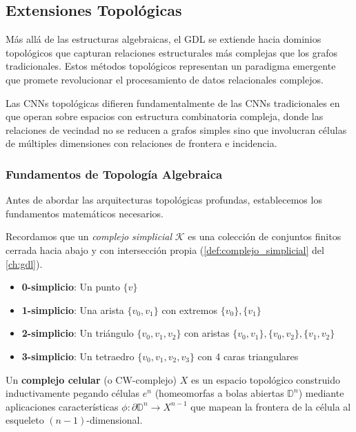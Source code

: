 \subsection{Extensiones Topológicas}

Más allá de las estructuras algebraicas, el \gls{GDL} se extiende hacia dominios topológicos que capturan relaciones estructurales más complejas que los grafos tradicionales. Estos métodos topológicos representan un paradigma emergente que promete revolucionar el procesamiento de datos relacionales complejos.

Las CNNs topológicas difieren fundamentalmente de las CNNs tradicionales en que operan sobre espacios con estructura combinatoria compleja, donde las relaciones de vecindad no se reducen a grafos simples sino que involucran células de múltiples dimensiones con relaciones de frontera e incidencia.

\subsubsection{Fundamentos de Topología Algebraica}

Antes de abordar las arquitecturas topológicas profundas, establecemos los fundamentos matemáticos necesarios.

Recordamos que un \textit{complejo simplicial} $\mathcal{K}$ es una colección de conjuntos finitos cerrada hacia abajo y con intersección propia (\autoref{def:complejo_simplicial} del \autoref{ch:gdl}).\label{def:complejo_simplicial_cnn}

\begin{example}\label{ex:simplicios_bajos}
\leavevmode
\begin{itemize}
    \item \textbf{0-simplicio}: Un punto $\{v\}$
    \item \textbf{1-simplicio}: Una arista $\{v_0, v_1\}$ con extremos $\{v_0\}, \{v_1\}$
    \item \textbf{2-simplicio}: Un triángulo $\{v_0, v_1, v_2\}$ con aristas $\{v_0,v_1\}, \{v_0,v_2\}, \{v_1,v_2\}$
    \item \textbf{3-simplicio}: Un tetraedro $\{v_0, v_1, v_2, v_3\}$ con 4 caras triangulares
\end{itemize}
\end{example}

\begin{definition}\label{def:complejo_celular}
Un \textbf{complejo celular} (o CW-complejo) $X$ es un espacio topológico construido inductivamente pegando células $e^n$ (homeomorfas a bolas abiertas $\mathbb{D}^n$) mediante aplicaciones características $\phi: \partial \mathbb{D}^n \to X^{n-1}$ que mapean la frontera de la célula al esqueleto $(n-1)$-dimensional.
\end{definition}

